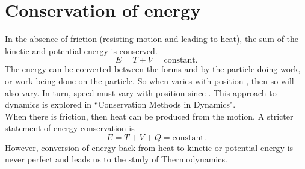 \section{Conservation of energy}
In the absence of friction (resisting motion and leading to heat), the sum  of the kinetic and potential energy is conserved.
\begin{equation*} E = T + V =  \textrm{constant}.
\end{equation*}
The energy can be converted between the forms  and  by the particle doing work, or work being done on the particle. So when  varies with position , then so will \value{T}{E - V(x)}{} also vary.  In turn, speed  must vary with position since .  This approach to dynamics is explored in ``Conservation Methods in Dynamics".\\ When there is friction, then heat  can be produced from the motion.  A stricter statement of energy conservation is
\begin{equation*} E = T + V + Q =  \textrm{constant}.
\end{equation*}
However, conversion of energy  back from heat  to kinetic  or potential energy  is never perfect and leads us to the study of Thermodynamics.
